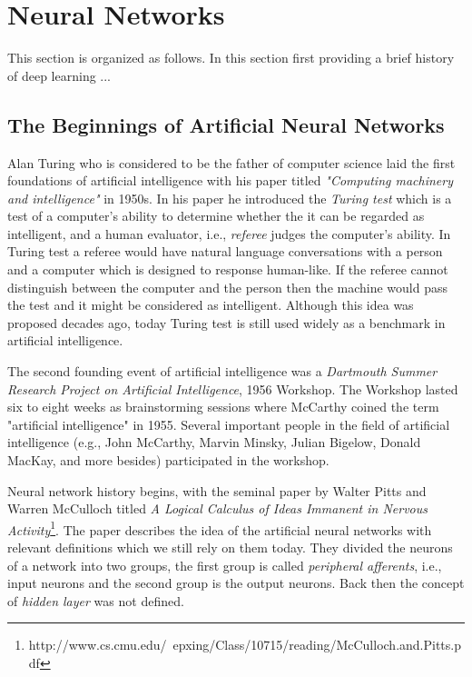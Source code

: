 \setcounter{secnumdepth}{4}
\section{Neural Networks}  \label{cha:foundations_basics_nn}
This section is organized as follows. In this section first providing a brief history of deep learning ...
\subsection{The Beginnings of Artificial Neural Networks}
Alan Turing who is considered to be the father of computer science laid  the first foundations of artificial intelligence with his paper titled \textit{"Computing machinery and intelligence"} in 1950s. In his paper he introduced the \textit{Turing test} which is a test of a computer's ability to determine whether the it can be regarded as intelligent, and a human evaluator, i.e., \textit{referee} judges the computer's ability. 
In Turing test a referee would have natural language conversations with a person and a computer which is designed to response human-like. If the referee cannot distinguish between the computer and the person then the machine would pass the test and it might be considered as intelligent. Although this idea was proposed decades ago, today Turing test is still used widely as a benchmark in artificial intelligence. 

The second founding event of artificial intelligence was a \textit{Dartmouth Summer Research Project on Artificial Intelligence}, 1956 Workshop. The Workshop lasted six to eight weeks as brainstorming sessions where McCarthy coined the term "artificial intelligence" in 1955. Several important people in the field of artificial intelligence (e.g., John McCarthy, Marvin Minsky, Julian Bigelow, Donald MacKay, and more besides) participated in the workshop.

Neural network history begins, with the seminal paper by Walter Pitts and Warren McCulloch titled \textit{A Logical Calculus of Ideas Immanent in Nervous Activity}\footnote{http://www.cs.cmu.edu/~epxing/Class/10715/reading/McCulloch.and.Pitts.pdf}. The paper describes the idea of the artificial neural networks with relevant definitions which we still rely on them today. They divided the neurons of a network into two groups, the first group is called \textit{peripheral afferents}, i.e., input neurons and the second group is the output neurons. Back then the concept of \textit{hidden layer} was not defined. 

